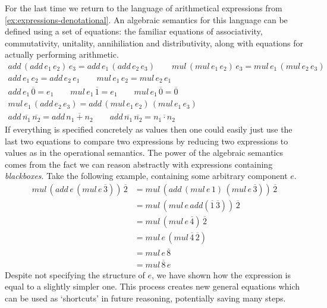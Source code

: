 \begin{example}\label{ex:expressions-algebraic}
    For the last time we return to the language of arithmetical expressions from
    \cref{ex:expressions-denotational}.
    An algebraic semantics for this language can be defined using a set of
    equations: the familiar equations of associativity, commutativity,
    unitality, annihiliation and distributivity, along with equations for
    actually performing arithmetic.
    \begin{gather*}
        add\,(add\,e_1\,e_2)\,e_3 = add\,e_1\,(add\,e_2\,e_3)
        \qquad
        mul\,(mul\,e_1\,e_2)\,e_3 = mul\,e_1\,(mul\,e_2\,e_3)
        \\
        add\,e_1\,e_2 = add\,e_2\,e_1
        \qquad
        mul\,e_1\,e_2 = mul\,e_2\,e_1
        \\
        add\,e_1\,\overline{0} = e_1
        \qquad
        mul\,e_1\,\overline{1} = e_1
        \qquad
        mul\,e_1\,\overline{0} = \overline{0}
        \\
        mul\,e_1\,(add\,e_2\,e_3) = add\,(mul\,e_1\,e_2)\,(mul\,e_1\,e_3)
        \\
        add\,\overline{n_1}\,\overline{n_2} = add\,\overline{n_1+n_2}
        \qquad
        add\,\overline{n_1}\,\overline{n_2} = \overline{n_1 \cdot n_2}
    \end{gather*}
    If everything is specified concretely as values then one could easily just
    use the last two equations to compare two expressions by reducing
    two expressions to values as in the operational semantics.
    The power of the algebraic semantics comes from the fact we can reason
    abstractly with expressions containing \emph{blackboxes}.
    Take the following example, containing some arbitrary component \(e\).
    \begin{align*}
        mul\,(add\,e\,(mul\,e\,\overline{3}))\,\overline{2}
        &=
        mul\,(add\,(mul\,e\,1)\,(mul\,e\,\overline{3}))\,\overline{2}
        \\
        &=
        mul\,(mul\,e\, add(\overline{1}\,\overline{3}))\,\overline{2}
        \\
        &=
        mul\,(mul \,e\,\overline{4})\,\overline{2}
        \\
        &=
        mul\,e\,(mul \,\overline{4}\,\overline{2})
        \\
        &=
        mul\,e\,\overline{8}
        \\
        &=
        mul\,\overline{8}\,e
    \end{align*}
    Despite not specifying the structure of \(e\), we have
    shown how the expression is equal to a slightly simpler one.
    This process creates new general equations which can be used as `shortcuts'
    in future reasoning, potentially saving many steps.
\end{example}

